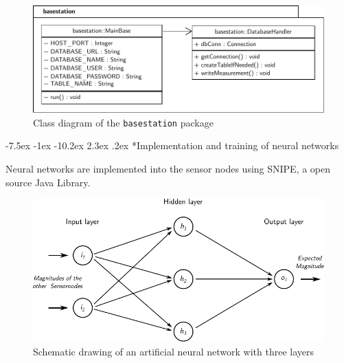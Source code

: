 \documentclass[12pt,a4paper]{scrartcl}
\makeatletter
\renewcommand\section{\@startsection{section}{1}{\z@}%
                     {-7.5ex \@plus -1ex \@minus -10.2ex}%
                     {2.3ex \@plus.2ex}%
                     {\sffamily\large\bfseries}}
\makeatother
\begin{document}
\begin{figure}[htb]
    \centering
    \includegraphics[width = \textwidth]{figures/uml-basestation.pdf}
    \caption{Class diagram of the \texttt{basestation} package}
    \label{fig:UML-bs}
\end{figure}


\section*{Implementation and training of neural networks}

Neural networks are implemented into the sensor nodes using SNIPE, a open source Java Library.
\begin{figure}[ht]
    \centering
    \includegraphics{figures/neuralnetwork.pdf}
    \caption{Schematic drawing of an artificial neural network with three layers}
    \label{fig:neuralnetwork}
\end{figure}


\end{document}
